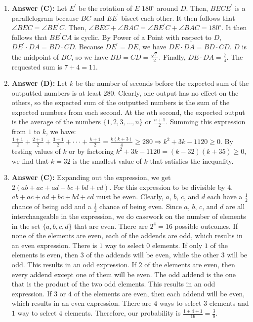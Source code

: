\documentclass[12pt]{scrartcl}
\begin{document}
\begin{enumerate}
\item \textbf{Answer (C):} Let $E^{\prime}$ be the rotation of $E$ $180^{\circ}$ around $D$. Then, $BECE^{\prime}$ is a parallelogram because $BC$ and $EE^{\prime}$ bisect each other. It then follows that $\angle BEC=\angle BE^{\prime}C$. Then, $\angle BEC+\angle BAC=\angle BE^{\prime}C+\angle BAC=180^{\circ}$. It then follows that $BE^{\prime}CA$ is cyclic. By Power of a Point with respect to $D$, $DE^{\prime}\cdot DA=BD\cdot CD$. Because $DE^{\prime}=DE$, we have $DE\cdot DA=BD\cdot CD$. $D$ is the midpoint of $BC$, so we have $BD=CD=\frac{\sqrt{7}}{2}$. Finally, $DE\cdot DA=\frac{7}{4}$. The requested sum is $7+4=11$.

\item \textbf{Answer (D):} Let $k$ be the number of seconds before the expected sum of the outputted numbers is at least $280$. Clearly, one output has no effect on the others, so the expected sum of the outputted numbers is the sum of the expected numbers from each second. At the $n$th second, the expected output is the average of the numbers $\{1,2,3,..., n\}$ or $\frac{n+1}{2}$. Summing this expression from $1$ to $k$, we have: $\frac{1+1}{2}+\frac{2+1}{2}+\frac{3+1}{2}+\cdot\cdot\cdot+\frac{k+1}{2}=\frac{k(k+3)}{4}\ge280\Rightarrow k^{2}+3k-1120\ge0$. By testing values of $k$ or by factoring $k^{2}+3k-1120=(k-32)(k+35)\ge0$, we find that $k=32$ is the smallest value of $k$ that satisfies the inequality.

\item \textbf{Answer (C):} Expanding out the expression, we get $2(ab+ac+ad+bc+bd+cd)$. For this expression to be divisible by $4$, $ab+ac+ad+bc+bd+cd$ must be even. Clearly, $a$, $b$, $c$, and $d$ each have a $\frac{1}{2}$ chance of being odd and a $\frac{1}{2}$ chance of being even. Since $a$, $b$, $c$, and $d$ are all interchangeable in the expression, we do casework on the number of elements in the set $\{a, b, c, d\}$ that are even. There are $2^{4}=16$ possible outcomes. If none of the elements are even, each of the addends are odd, which results in an even expression. There is $1$ way to select $0$ elements. If only $1$ of the elements is even, then $3$ of the addends will be even, while the other $3$ will be odd. This results in an odd expression. If $2$ of the elements are even, then every addend except one of them will be even. The odd addend is the one that is the product of the two odd elements. This results in an odd expression. If $3$ or $4$ of the elements are even, then each addend will be even, which results in an even expression. There are $4$ ways to select $3$ elements and $1$ way to select $4$ elements. Therefore, our probability is $\frac{1+4+1}{16}=\frac{3}{8}$.


\end{enumerate}
\end{document}

